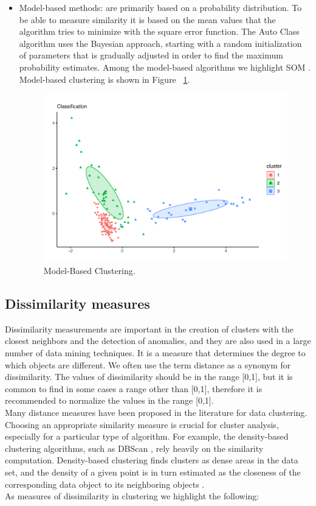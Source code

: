 \begin{itemize}
  \item Model-based methods: are primarily based on a probability distribution. To be able to measure similarity it is based on the mean values that the algorithm tries to minimize with the square error function. The Auto Class algorithm uses the Bayesian approach, starting with a random initialization of parameters that is gradually adjusted in order to find the maximum probability estimates. Among the model-based algorithms we highlight SOM \citep{R:anbupalam-indranil-xiaojing-george:2006}. Model-based clustering is shown in Figure ~\ref{fig:model}.
    \begin{figure}[htbp]
  \centering
   \includegraphics[width=0.9\linewidth, height=0.16\textheight]{img/model.pdf}
    \caption{Model-Based Clustering.}
    \label{fig:model}%
\end{figure}
\end{itemize}

\subsection {Dissimilarity measures}

Dissimilarity measurements are important in the creation of clusters with the closest neighbors and the detection of anomalies, and they are also used in a large number of data mining techniques. It is a measure that determines the degree to which objects are different. We often use the term distance as a synonym for dissimilarity. The values of dissimilarity should be in the range [0,1], but it is common to find in some cases a range other than [0,1], therefore it is recommended to normalize the values in the range [0,1].
\\
Many distance measures have been proposed in the literature for data clustering. Choosing an appropriate similarity measure is crucial for cluster analysis, especially for a particular type of algorithm. For example, the density-based clustering algorithms, such as DBScan \citep{R:shan:2019}, rely heavily on the similarity computation. Density-based clustering finds clusters as dense areas in the data set, and the density of a given point is in turn estimated as the closeness of the corresponding data object to its neighboring objects \citep{R:shraddha-suchita-others:2011} \citep{R:aliseyed-saeed-teh:2015}.
\\
As measures of dissimilarity in clustering we highlight the following:

